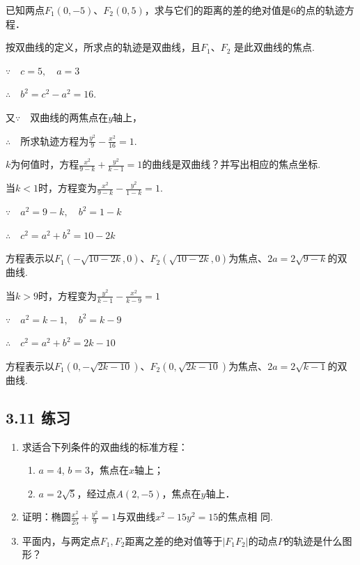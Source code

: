 \begin{example}
    已知两点$F_1(0,-5)$、$F_2(0,5)$，求与它们的距离的差的绝对值是6的点的轨迹方程．
\end{example}

\begin{solution}
按双曲线的定义，所求点的轨迹是双曲线，且$F_1$、$F_2$
是此双曲线的焦点.

$\because\quad c=5,\quad a=3$

$\therefore\quad b^2=c^2-a^2=16$.

又$\because\quad $双曲线的两焦点在$y$轴上，

$\therefore\quad $所求轨迹方程为$\frac{y^2}{9}-\frac{x^2}{16}=1$.
\end{solution}


\begin{example}
    $k$为何值时，方程$\frac{x^2}{9-k}+\frac{y^2}{k-1}=1$的曲线是双曲线？并写出相应的焦点坐标.
\end{example}

\begin{solution}
    当$k<1$时，方程变为$\frac{x^2}{9-k}-\frac{y^2}{1-k}=1$.

$\because\quad a^2=9-k,\quad b^2=1-k$

$\therefore\quad c^2=a^2+b^2=10-2k$

方程表示以$F_1(-\sqrt{10-2k},0)$、$F_2(\sqrt{10-2k},0)$为焦点、$2a=2\sqrt{9-k}$的双曲线.

当$k>9$时，方程变为$\frac{y^2}{k-1}-\frac{x^2}{k-9}=1$

$\because\quad a^2=k-1,\quad b^2=k-9$

$\therefore\quad c^2=a^2+b^2=2k-10$

方程表示以$F_1(0,-\sqrt{2k-10})$、$F_2(0,\sqrt{2k-10})$为焦点、$2a=2\sqrt{k-1}$的双曲线.
\end{solution}

\subsection*{3.11 练习}
\begin{enumerate}
\item 求适合下列条件的双曲线的标准方程：
\begin{enumerate}[(1)]
\item $a=4$, $b=3$，焦点在$x$轴上；
\item $a=2\sqrt{5}$，经过点$A(2,-5)$，焦点在$y$轴上．
\end{enumerate}

\item 证明：椭圆$\frac{x^2}{25}+\frac{y^2}{9}=1$与双曲线$x^2-15y^2=15$的焦点相
同.
\item 平面内，与两定点$F_1, F_2$距离之差的绝对值等于$|F_1F_2|$的动点$P$的轨迹是什么图形？   
\end{enumerate}

